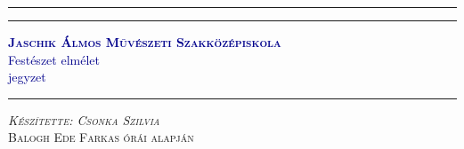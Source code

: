 \begin{titlepage} %
	
	\centering %
	
	
	\rule{\textwidth}{1pt} %
	
	\vspace{2pt}\vspace{-\baselineskip} %
	
	\rule{\textwidth}{0.4pt} %
	
	\vspace{1cm}
	
	
	\textcolor{DarkBlue}{ %
		{\Huge \textsc{\textbf{Jaschik Álmos Művészeti Szakközépiskola}}}\\
		\vspace{1cm} %
		{\Huge Festészet elmélet}\\[0.5\baselineskip] %
		{\Large jegyzet}\\[0.5\baselineskip] %
	}
	
	\vspace{0.025\textheight} %
	
	\rule{0.3\textwidth}{0.4pt} %
	
	\vspace{0.1\textheight} %
	
	
	{\Large \textsc{\textit{Készítette: Csonka Szilvia}}}\\ %
	\vspace{1cm}
	{\Large \textsc{Balogh Ede Farkas órái alapján}} %
	
	\vspace{1cm}
	

\end{titlepage}
